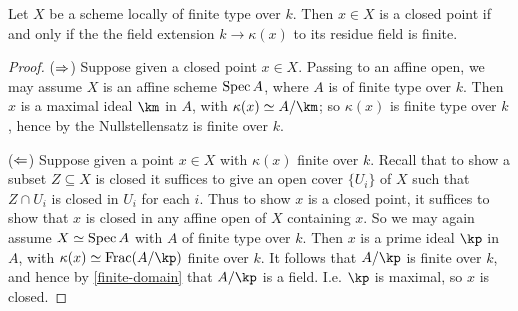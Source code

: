 \begin{lemma}
  \label{closed-finite}
  Let $X$ be a scheme locally of finite type over $k$. Then $x \in X$ is a closed point if and only if the the field extension $k \to \kappa(x)$ to its residue field is finite.

  \begin{proof}
    ($\Rightarrow$) Suppose given a closed point $x \in X$. Passing to an affine open, we may assume $X$ is an affine scheme $\operatorname{Spec} A$, where $A$ is of finite type over $k$. Then $x$ is a maximal ideal $\km$ in $A$, with $\kappa(x) \iso A/\km$; so $\kappa(x)$ is finite type over $k$, hence by the Nullstellensatz is finite over $k$.

    ($\Leftarrow$) Suppose given a point $x \in X$ with $\kappa(x)$ finite over $k$. Recall that to show a subset $Z \subseteq X$ is closed it suffices to give an open cover $\{U_i\}$ of $X$ such that $Z \cap U_i$ is closed in $U_i$ for each $i$. Thus to show $x$ is a closed point, it suffices to show that $x$ is closed in any affine open of $X$ containing $x$. So we may again assume $X \simeq \operatorname{Spec} A$ with $A$ of finite type over $k$. Then $x$ is a prime ideal $\kp$ in $A$, with $\kappa(x) \iso \Frac(A/\kp)$ finite over $k$. It follows that $A/\kp$ is finite over $k$, and hence by \cref{finite-domain} that $A/\kp$ is a field. I.e. $\kp$ is maximal, so $x$ is closed.
  \end{proof}
\end{lemma}


